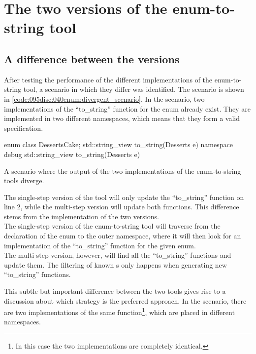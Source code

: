 \section{The two versions of the enum-to-string tool}


\subsection{A difference between the versions}
After testing the performance of the different implementations of the enum-to-string tool, a scenario in which they differ was identified. The scenario is shown in \cref{code:095disc:040enum:divergent_scenario}. In the scenario, two implementations of the ``to\_string'' function for the  enum already exist. They are implemented in two different namespaces, which means that they form a valid specification.

\begin{listing}[H]
    \begin{cppcode}
enum class Desserts{Cake};
std::string_view to_string(Desserts e){}
namespace debug {
    std::string_view to_string(Desserts e){}
}
    \end{cppcode}
    \caption{A scenario where the output of the two implementations of the enum-to-string tools diverge.}
    \label{code:095disc:040enum:divergent_scenario}
  \end{listing}

The single-step version of the tool will only update the ``to\_string'' function on line 2, while the multi-step version will update both functions.
This difference stems from the implementation of the two versions.\\
The single-step version of the enum-to-string tool will traverse from the declaration of the enum to the outer namespace, where it will then look for an implementation of the ``to\_string'' function for the given enum.\\
The multi-step version, however, will find all the ``to\_string'' functions and update them. The filtering of known s only happens when generating new ``to\_string'' functions.

This subtle but important difference between the two tools gives rise to a discussion about which strategy is the preferred approach. In the scenario, there are two implementations of the same function\footnote{In this case the two implementations are completely identical.}, which are placed in different namespaces. 

